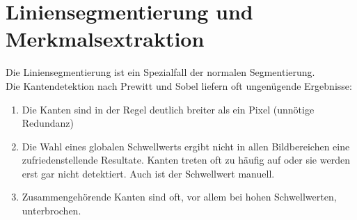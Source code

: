 \section{Liniensegmentierung und Merkmalsextraktion}
Die Liniensegmentierung ist ein Spezialfall der normalen Segmentierung.\\
Die Kantendetektion nach Prewitt und Sobel liefern oft ungenügende Ergebnisse:
\begin{enumerate}
    \item Die Kanten sind in der Regel deutlich breiter als ein Pixel (unnötige Redundanz)
    \item Die Wahl eines globalen Schwellwerts ergibt nicht in allen Bildbereichen eine zufriedenstellende Resultate. Kanten treten oft zu häufig auf oder sie werden erst gar nicht detektiert. Auch ist der Schwellwert manuell.
    \item Zusammengehörende Kanten sind oft, vor allem bei hohen Schwellwerten, unterbrochen.
\end{enumerate}

